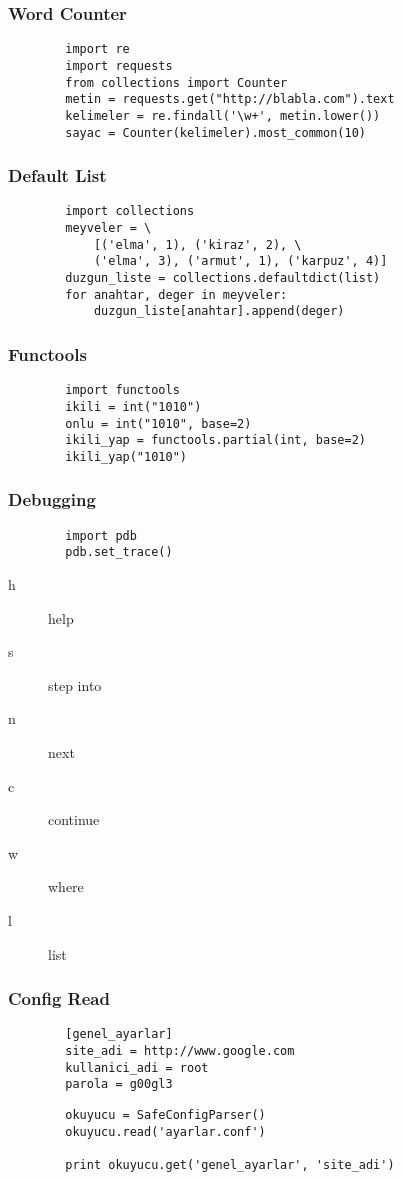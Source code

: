 \documentclass[10pt, compress]{beamer}
\begin{document}
\begin{frame}[fragile]
\frametitle{Word Counter}    
    \begin{verbatim}
        import re
        import requests
        from collections import Counter
        metin = requests.get("http://blabla.com").text
        kelimeler = re.findall('\w+', metin.lower())
        sayac = Counter(kelimeler).most_common(10)
    \end{verbatim}
\end{frame}

\begin{frame}[fragile]
\frametitle{Default List}    
    \begin{verbatim}
        import collections
        meyveler = \
            [('elma', 1), ('kiraz', 2), \
            ('elma', 3), ('armut', 1), ('karpuz', 4)]
        duzgun_liste = collections.defaultdict(list)
        for anahtar, deger in meyveler:
            duzgun_liste[anahtar].append(deger)
    \end{verbatim}
\end{frame}

\begin{frame}[fragile]
\frametitle{Functools}    
    \begin{verbatim}
        import functools
        ikili = int("1010")
        onlu = int("1010", base=2)
        ikili_yap = functools.partial(int, base=2)
        ikili_yap("1010")
    \end{verbatim}
\end{frame}

\begin{frame}[fragile]
\frametitle{Debugging}    
    \begin{verbatim}
        import pdb
        pdb.set_trace()
    \end{verbatim}
    \begin{description}
        \item[h] help
        \item[s] step into
        \item[n] next
        \item[c] continue
        \item[w] where
        \item[l] list
    \end{description}
\end{frame}

\begin{frame}[fragile]
\frametitle{Config Read}    
    \begin{verbatim}
        [genel_ayarlar]
        site_adi = http://www.google.com
        kullanici_adi = root
        parola = g00gl3
    \end{verbatim}
    \begin{verbatim}
        okuyucu = SafeConfigParser()
        okuyucu.read('ayarlar.conf')
        
        print okuyucu.get('genel_ayarlar', 'site_adi')
    \end{verbatim}
\end{frame}
\end{document}
